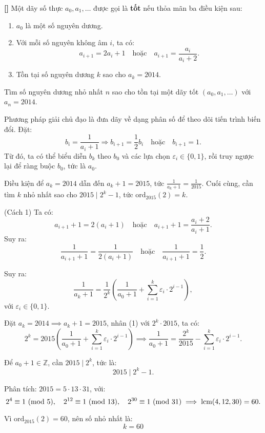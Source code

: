 \documentclass[../05-modular-arithmetic-a.tex]{subfiles}
\begin{document}
\begin{example*}\label{example:APMO-2015-MO-P3}\textbf{[]}
	Một dãy số thực \( a_0, a_1, \ldots \) được gọi là \textbf{tốt} nếu thỏa mãn ba điều kiện sau:
	\begin{enumerate}[topsep=0pt, partopsep=0pt, itemsep=0pt, label=(\roman*)]
		\item \( a_0 \) là một số nguyên dương.
		\item Với mỗi số nguyên không âm \( i \), ta có:
		\[
			a_{i+1} = 2a_i + 1 \quad \text{hoặc} \quad a_{i+1} = \frac{a_i}{a_i + 2}.
		\]
		\item Tồn tại số nguyên dương \( k \) sao cho \( a_k = 2014 \).
	\end{enumerate}
	
	Tìm số nguyên dương nhỏ nhất \( n \) sao cho tồn tại một dãy tốt \( (a_0, a_1, \ldots) \) với \( a_n = 2014 \).	
\end{example*}

\begin{story*}
    Phương pháp giải chủ đạo là đưa dãy về dạng phân số để theo dõi tiến trình biến đổi. Đặt:
    \[
        b_i = \frac{1}{a_i + 1}
        \Rightarrow
        b_{i+1} = \frac{1}{2} b_i \quad \text{hoặc} \quad b_{i+1} = 1.
    \]
    Từ đó, ta có thể biểu diễn \( b_k \) theo \( b_0 \) và các lựa chọn \( \varepsilon_i \in \{0, 1\} \), rồi truy ngược lại để ràng buộc \( b_0 \), tức là \( a_0 \).  

    Điều kiện để \( a_k = 2014 \) dẫn đến \( a_k + 1 = 2015 \), tức \( \frac{1}{a_k + 1} = \frac{1}{2015} \).  
    Cuối cùng, cần tìm \( k \) nhỏ nhất sao cho \( 2015 \mid 2^k - 1 \), tức \( \text{ord}_{2015}(2) = k \).
\end{story*}

\bigbreak

\begin{soln}(Cách 1)\footnotemark
	Ta có:
	\[
		a_{i+1} + 1 = 2(a_i + 1) \quad \text{hoặc} \quad a_{i+1} + 1 = \frac{a_i + 2}{a_i + 1}.
	\]
	Suy ra:
	\[
		\frac{1}{a_{i+1} + 1} = \frac{1}{2(a_i + 1)} \quad \text{hoặc} \quad \frac{1}{a_{i+1} + 1} = \frac{1}{2}.
	\]

	Suy ra:
	\[
		\frac{1}{a_k + 1} = \frac{1}{2^k} \left( \frac{1}{a_0 + 1} + \sum_{i = 1}^{k} \varepsilon_i \cdot 2^{i - 1} \right), \tag{1}
	\]
	với \( \varepsilon_i \in \{0, 1\} \).

	Đặt \( a_k = 2014 \implies a_k + 1 = 2015 \), nhân (1) với \( 2^k \cdot 2015 \), ta có:
	\[
		2^k = 2015 \left( \frac{1}{a_0 + 1} + \sum_{i = 1}^{k} \varepsilon_i \cdot 2^{i - 1} \right)
	\implies \frac{1}{a_0 + 1} = \frac{2^k}{2015} - \sum_{i = 1}^{k} \varepsilon_i \cdot 2^{i - 1}.
	\]

	Để \( a_0 + 1 \in \mathbb{Z} \), cần \( 2015 \mid 2^k \), tức là:
	\[
		2015 \mid 2^k - 1.
	\]

	Phân tích: \( 2015 = 5 \cdot 13 \cdot 31 \), với:
	\[
		2^4 \equiv 1 \ (\mathrm{mod}\ 5),\quad 2^{12} \equiv 1 \ (\mathrm{mod}\ 13),\quad 2^{30} \equiv 1 \ (\mathrm{mod}\ 31)
	\implies \text{lcm}(4, 12, 30) = 60.
	\]

	Vì \( \text{ord}_{2015}(2) = 60 \), nên số nhỏ nhất là:
	\[
		\boxed{k = 60}
	\]
\end{soln}
\end{document}
